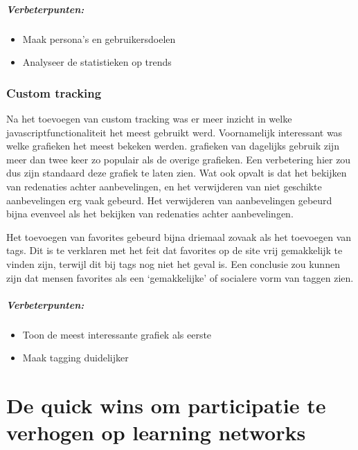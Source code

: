 \documentclass[a4paper, 10pt, pdftex]{report}
\begin{document}
    \paragraph{\textbf{Verbeterpunten:}}
      \begin{itemize}
        \item Maak persona's en gebruikersdoelen
        \item Analyseer de statistieken op trends
      \end{itemize}

    \subsection{Custom tracking}
    Na het toevoegen van custom tracking was er meer inzicht in welke javascriptfunctionaliteit het meest gebruikt werd. Voornamelijk interessant was welke grafieken het meest bekeken werden. grafieken van dagelijks gebruik zijn meer dan twee keer zo populair als de overige grafieken. Een verbetering hier zou dus zijn standaard deze grafiek te laten zien. Wat ook opvalt is dat het bekijken van redenaties achter aanbevelingen, en het verwijderen van niet geschikte aanbevelingen erg vaak gebeurd. Het verwijderen van aanbevelingen gebeurd bijna evenveel als het bekijken van redenaties achter aanbevelingen.

    Het toevoegen van favorites gebeurd bijna driemaal zovaak als het toevoegen van tags. Dit is te verklaren met het feit dat favorites op de site vrij gemakkelijk te vinden zijn, terwijl dit bij tags nog niet het geval is. Een conclusie zou kunnen zijn dat mensen favorites als een `gemakkelijke' of socialere vorm van taggen zien.

    \paragraph{\textbf{Verbeterpunten:}}
      \begin{itemize}
        \item Toon de meest interessante grafiek als eerste
        \item Maak tagging duidelijker
      \end{itemize}


  \newpage
  \chapter{De quick wins om participatie te verhogen op learning networks}
    \newpage
\end{document}
